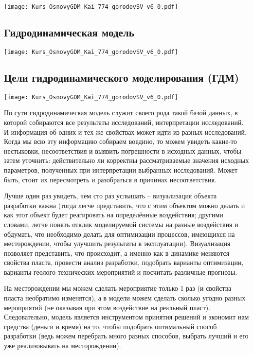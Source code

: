 \documentclass[main.tex]{subfiles}
\begin{document}
\texttt{[image: Kurs\_OsnovyGDM\_Kai\_774\_gorodovSV\_v6\_0.pdf]}

\subsection{Гидродинамическая модель}

\texttt{[image: Kurs\_OsnovyGDM\_Kai\_774\_gorodovSV\_v6\_0.pdf]}

\subsection{Цели гидродинамического моделирования (ГДМ)}

\texttt{[image: Kurs\_OsnovyGDM\_Kai\_774\_gorodovSV\_v6\_0.pdf]}

По сути гидродинамическая модель служит своего рода такой базой данных, в которой собираются все результаты исследований, интерпретации исследований.
И информация об одних и тех же свойствах может идти из разных исследований.
Когда мы всю эту информацию собираем воедино, то можем увидеть какие-то нестыковки, несоответствия и выявить погрешности в исходных данных, чтобы затем уточнить: действительно ли корректны рассматриваемые значения исходных параметров, полученных при интерпретации выбранных исследований.
Может быть, стоит их пересмотреть и разобраться в причинах несоответствия.

Лучше один раз увидеть, чем сто раз услышать -- визуализация объекта разработки важна (тогда легче представить, что с этим объектом можно делать и как этот объект будет реагировать на определённые воздействия; другими словами, легче понять отклик моделируемой системы на разные воздействия и обдумать, что необходимо делать для оптимизации процессов, имеющихся на месторождении, чтобы улучшить результаты в эксплуатации).
Визуализация позволяет представить, что происходит, а именно как в динамике меняются свойства пласта, провести анализ разработки, подобрать варианты оптимизации, варианты геолого-технических мероприятий и посчитать различные прогнозы.

На месторождении мы можем сделать мероприятие только 1 раз (и свойства пласта необратимо изменятся), а в модели можем сделать сколько угодно разных мероприятий (не оказывая при этом воздействие на реальный пласт).
Следовательно, модель является инструментом принятия решений и экономит нам средства (деньги и время) на то, чтобы подобрать оптимальный способ разработки (ведь можем перебрать много разных способов, выбрать лучший и его уже реализовывать на месторождении).
\end{document}
